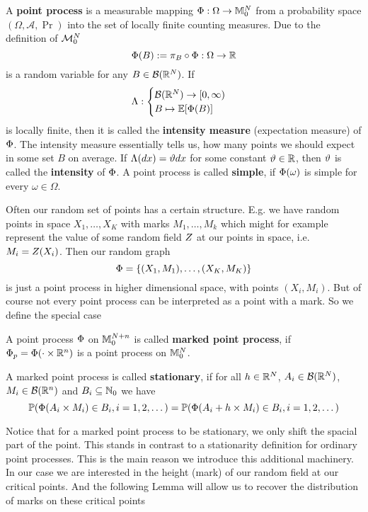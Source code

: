 \begin{definition}
	A \textbf{point process} is a measurable mapping \(\pp:\Omega\to\locFiniteMeasure\)
	from a probability space \((\Omega, \mathcal{A}, \Pr)\) into the set of
	locally finite counting measures. Due to the definition of \(\locFiniteMeasAlg\)
	\[
		\pp(B) := \pi_B\circ \pp : \Omega \to \real
	\]
	is a random variable for any \(B\in\borel(\real^\dims)\). If
	\[
		\intensityMeas:\begin{cases}
			\borel(\real^\dims)\to [0,\infty)\\
			B \mapsto \E[\pp(B)]
		\end{cases}
	\]
	is locally finite, then it is called the \textbf{intensity measure}
	(expectation measure) of \(\pp\). The intensity measure essentially tells
	us, how many points we should expect in some set \(B\) on average.
	If \(\intensityMeas(dx) = \intensity dx\) for some
	constant \(\intensity\in\real\), then \(\intensity\) is called the
	\textbf{intensity} of \(\pp\).
	A point process is called \textbf{simple}, if \(\pp(\omega)\) is simple
	for every \(\omega\in\Omega\).
\end{definition}

Often our random set of points has a certain structure. E.g. we have
random points in space \(X_1,\dots, X_K\) with marks \(M_1,\dots, M_k\) which
might for example represent the value of some random field \(\rf\) at our
points in space, i.e. \(M_i=\rf(X_i)\). Then our random graph 
\[
	\pp = \{ (X_1, M_1), \dots, (X_K, M_K) \}
\]
is just a point process in higher dimensional space, with points \((X_i, M_i)\).
But of course not every point process can be interpreted as a point with a mark.
So we define the special case

\begin{definition}
	A point process \(\pp\) on \(\locFiniteMeasure[\dims+n]\) is called
	\textbf{marked point process}, if \(\pp_p = \pp(\cdot \times \real^n)\)
	is a point process on \(\locFiniteMeasure\).

	A marked point process is called \textbf{stationary}, if for all
	\(h\in\real^\dims\), \(A_i\in\borel(\real^\dims)\),
	\(M_i\in\borel(\real^n)\) and \(B_i\subseteq\nat_0\) we have
	\[
		\Pr(\pp(A_i\times M_i) \in B_i, i=1,2,\dots)
		= \Pr(\pp(A_i+h \times M_i)\in B_i, i=1,2,\dots)
	\]
\end{definition}

Notice that for a marked point process to be stationary, we only shift the
spacial part of the point. This stands in contrast to a stationarity definition
for ordinary point processes. This is the main reason we introduce this
additional machinery. In our case we are interested in the height (mark) of
our random field at our critical points. And the following Lemma will allow us
to recover the distribution of marks on these critical points
